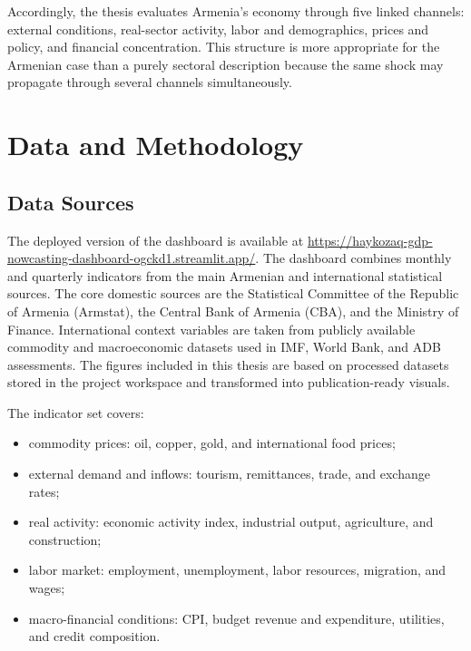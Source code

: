 \documentclass[12pt,a4paper]{report}
\begin{document}
Accordingly, the thesis evaluates Armenia's economy through five linked channels: external conditions, real-sector activity, labor and demographics, prices and policy, and financial concentration. This structure is more appropriate for the Armenian case than a purely sectoral description because the same shock may propagate through several channels simultaneously.

\chapter{Data and Methodology}
\section{Data Sources}
The deployed version of the dashboard is available at \url{https://haykozaq-gdp-nowcasting-dashboard-ogckd1.streamlit.app/}. The dashboard combines monthly and quarterly indicators from the main Armenian and international statistical sources. The core domestic sources are the Statistical Committee of the Republic of Armenia (Armstat), the Central Bank of Armenia (CBA), and the Ministry of Finance. International context variables are taken from publicly available commodity and macroeconomic datasets used in IMF, World Bank, and ADB assessments. The figures included in this thesis are based on processed datasets stored in the project workspace and transformed into publication-ready visuals.\cite{armstatbank,cbaMPR2025Q1,minfinBudget,imfCR24348,wbMEU2025,adbADO2024}

The indicator set covers:
\begin{itemize}
    \item commodity prices: oil, copper, gold, and international food prices;
    \item external demand and inflows: tourism, remittances, trade, and exchange rates;
    \item real activity: economic activity index, industrial output, agriculture, and construction;
    \item labor market: employment, unemployment, labor resources, migration, and wages;
    \item macro-financial conditions: CPI, budget revenue and expenditure, utilities, and credit composition.
\end{itemize}
\end{document}

